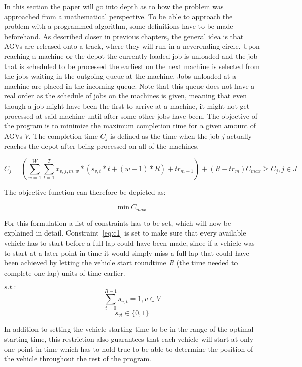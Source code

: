 \setcounter{equation}{0}
In this section the paper will go into depth as to how the problem was approached from a mathematical perspective. To be able to approach the problem
with a programmed algorithm, some definitions have to be made beforehand. As described closer in previous chapters, the general idea is that AGVs
are released onto a track, where they will run in a neverending circle. Upon reaching a machine or the depot the currently loaded job is unloaded and
the job that is scheduled to be processed the earliest on the next machine is selected from the jobs waiting in the outgoing queue at the machine.
Jobs unloaded at a machine are placed in the incoming queue. Note that this queue does not have a real order as the schedule of jobs on the machines is
given, meaning that even though a job might have been the first to arrive at a machine, it might not get processed at said machine until after some
other jobs have been. The objective of the program is to minimize the maximum completion time for a given amount of AGVs \(V\). The completion time
\(C_{j}\) is defined as the time when the job \(j\) actually reaches the depot after being processed on all of the machines.

\[
  C_{j} = (\sum_{w=1}^{W}\sum_{t=1}^{T} x_{v,j,m,w} * (s_{v,t} * t + (w-1) * R) + tr_{m-1}) + (R-tr_{m})
  C_{max} \geq C_{j}, j \in J
\]

The objective function can therefore be depicted as:

\begin{equation} \label{eq:c1}
\mathrm{min}\>C_{max}
\end{equation}

For this formulation a list of constraints has to be set, which will now be explained in detail. Constraint~\ref{eq:c1} is set to make sure
that every available vehicle has to start before a full lap could have been made, since if a vehicle was to start at a later point in time it would
simply miss a full lap that could have been achieved by letting the vehicle start roundtime \(R\) (the time needed to complete one lap) units of time earlier.

\(s.t.:\)
\begin{equation} \label{eq:c2}
\sum_{t=0}^{R-1}s_{v,t} = 1, v \in V
\end{equation}
\begin{equation} \label{eq:c3}
s_{v t}\in\{0,1\}
\end{equation}

In addition to setting the vehicle starting time to be in the range of the optimal starting time, this restriction also guarantees that each vehicle
will start at only one point in time which has to hold true to be able to determine the position of the vehicle throughout the rest of the program.

